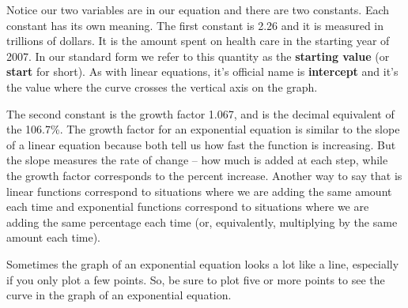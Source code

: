 \bigskip
\bigskip

Notice our two variables are in our equation and there are two constants. Each constant has its own meaning.  The first constant is 2.26 and it is measured in trillions of dollars.  It is the amount spent on health care in the starting year of 2007.  In our standard form we refer to this quantity as the \textbf{starting value} (or \textbf{start} for short).  As with linear equations, it's official name is \textbf{intercept} and it's the value where the curve crosses the vertical axis on the graph.

The second constant is the growth factor 1.067, and is the decimal equivalent of the 106.7\%.  The growth factor for an exponential equation is similar to the slope of a linear equation because both tell us how fast the function is increasing.  But the slope measures the rate of change -- how much is added at each step, while the growth factor corresponds to the percent increase.  Another way to say that is linear functions correspond to situations where we are adding the same amount each time and exponential functions correspond to situations where we are adding the same percentage each time (or, equivalently, multiplying by the same amount each time).

Sometimes the graph of an exponential equation looks a lot like a  line, especially if you only plot a few points.  So, be sure to plot five or more points to see the curve in the graph of an exponential equation. 

